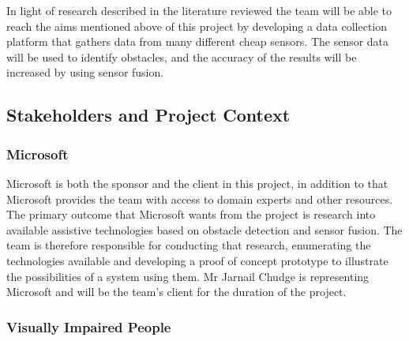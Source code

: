 \documentclass[prodmode,acmtosem]{acmsmall} %
\begin{document}
In light of research described in the literature reviewed the team will be able to reach the aims mentioned above of this project by developing a data collection platform that gathers data from many different cheap sensors. The sensor data will be used to identify obstacles, and the accuracy of the results will be increased by using sensor fusion.





\subsection{Stakeholders and Project Context}

\subsubsection{Microsoft}
Microsoft is both the sponsor and the client in this project, in addition to that Microsoft provides the team with access to domain experts and other resources. The primary outcome that Microsoft wants from the project is research into available assistive technologies based on obstacle detection and sensor fusion. The team is therefore responsible for conducting that research, enumerating the technologies available and developing a proof of concept prototype to illustrate the possibilities of a system using them.
Mr Jarnail Chudge is representing Microsoft and will be the team's client for the duration of the project.

\subsubsection{Visually Impaired People}
\end{document}
